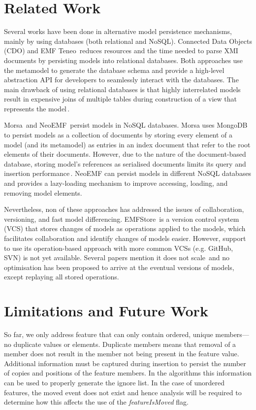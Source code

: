 \documentclass{llncs}
\begin{document}
\section{Related Work}
\label{sec:related_work}
Several works have been done in alternative model persistence mechanisms, mainly by using databases (both relational and NoSQL).
Connected Data Objects (CDO) \cite{eclipse2017cdo} and EMF Teneo\,\cite{eclipse2017teneo} reduces resources and the time needed to parse XMI documents by persisting models into relational databases.
Both approaches use the metamodel to generate the database schema and provide a high-level abstraction API for developers to seamlessly interact with the databases.
The main drawback of using relational databases is that highly interrelated models result in expensive joins of multiple tables during construction of a view that represents the model\,\cite{barmpis2014evaluation}. 

Morsa\,\cite{pagan2011morsa} and NeoEMF\,\cite{daniel2016neoemf} persist models in NoSQL databases.
Morsa uses MongoDB\,\cite{mongodb2017what} to persist models as a collection of documents by storing every element of a model (and its metamodel) as entries in an index document that refer to the root elements of their documents.%
However, due to the nature of the document-based database, storing model's references as serialised documents limits its query and insertion performance\,\cite{barmpis2014evaluation}.
NeoEMF can persist models in different NoSQL databases and provides a lazy-loading mechanism to improve accessing, loading, and removing model elements.

Nevertheless, non of these approaches has addressed the issues of collaboration, versioning, and fast model differencing.
EMFStore\,\cite{koegel2010emfstore} is a version control system (VCS) that stores changes of models as operations applied to the models, which facilitates collaboration and identify changes of models easier.
However, support to use its operation-based approach with more common VCSs (e.g. GitHub, SVN) is not yet available. Several papers mention it does not scale\,\cite{pagan2011morsa,kolovos2013research} and no optimisation has been proposed to arrive at the eventual versions of models, except replaying all stored operations. 


\section{Limitations and Future Work}
\label{sec:limitations_and_future_work}
So far, we only address feature that can only contain ordered, unique members---no duplicate values or elements.
Duplicate members means that removal of a member does not result in the member not being present in the feature value.
Additional information must be captured during insertion to persist the number of copies and positions of the feature members.
In the algorithms this information can be used to properly generate the ignore list.
In the case of unordered features, the moved event does not exist and hence analysis will be required to determine how this affects the use of the \emph{featureIsMoved} flag.
\end{document}
